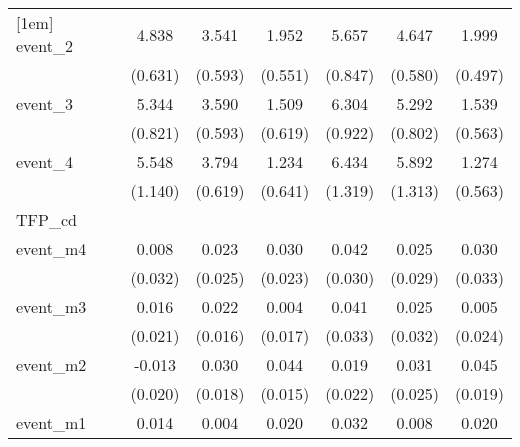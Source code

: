 {\begin{tabular}{l*{6}{c}}
[1em]
event\_2     &       4.838\sym{***}&       3.541\sym{***}&       1.952\sym{***}&       5.657\sym{***}&       4.647\sym{***}&       1.999\sym{***}\\
            &     (0.631)         &     (0.593)         &     (0.551)         &     (0.847)         &     (0.580)         &     (0.497)         \\
[1em]
event\_3     &       5.344\sym{***}&       3.590\sym{***}&       1.509\sym{*}  &       6.304\sym{***}&       5.292\sym{***}&       1.539\sym{**} \\
            &     (0.821)         &     (0.593)         &     (0.619)         &     (0.922)         &     (0.802)         &     (0.563)         \\
[1em]
event\_4     &       5.548\sym{***}&       3.794\sym{***}&       1.234         &       6.434\sym{***}&       5.892\sym{***}&       1.274\sym{*}  \\
            &     (1.140)         &     (0.619)         &     (0.641)         &     (1.319)         &     (1.313)         &     (0.563)         \\
\hline
TFP\_cd      &                     &                     &                     &                     &                     &                     \\
event\_m4    &       0.008         &       0.023         &       0.030         &       0.042         &       0.025         &       0.030         \\
            &     (0.032)         &     (0.025)         &     (0.023)         &     (0.030)         &     (0.029)         &     (0.033)         \\
[1em]
event\_m3    &       0.016         &       0.022         &       0.004         &       0.041         &       0.025         &       0.005         \\
            &     (0.021)         &     (0.016)         &     (0.017)         &     (0.033)         &     (0.032)         &     (0.024)         \\
[1em]
event\_m2    &      -0.013         &       0.030         &       0.044\sym{**} &       0.019         &       0.031         &       0.045\sym{*}  \\
            &     (0.020)         &     (0.018)         &     (0.015)         &     (0.022)         &     (0.025)         &     (0.019)         \\
[1em]
event\_m1    &       0.014         &       0.004         &       0.020         &       0.032         &       0.008         &       0.020         \\

\end{tabular}}
